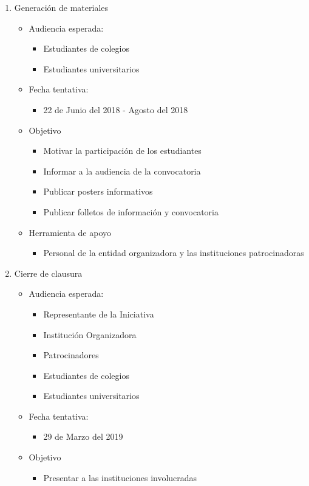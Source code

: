 \documentclass{article}
\begin{document}
\begin{enumerate}
\item Generación de materiales
\begin{itemize}
\item Audiencia esperada:
\begin{itemize}
\item Estudiantes de colegios
\item Estudiantes universitarios
\end{itemize}
\item Fecha tentativa:
\begin{itemize}
\item 22 de Junio del 2018 - Agosto del 2018
\end{itemize}
\item Objetivo
\begin{itemize}
\item Motivar la participación de los estudiantes
\item Informar a la audiencia de la convocatoria
\item Publicar posters informativos
\item Publicar folletos de información y convocatoria
\end{itemize}
\item Herramienta de apoyo
\begin{itemize}
\item Personal de la entidad organizadora y las instituciones patrocinadoras
\end{itemize}
\end{itemize}
\item Cierre de clausura
\begin{itemize}
\item Audiencia esperada:
\begin{itemize}
\item Representante de la Iniciativa
\item Institución Organizadora
\item Patrocinadores
\item Estudiantes de colegios
\item Estudiantes universitarios
\end{itemize}
\item Fecha tentativa:
\begin{itemize}
\item 29 de Marzo del 2019
\end{itemize}
\item Objetivo
\begin{itemize}
\item Presentar a las instituciones involucradas

\end{itemize}
\end{itemize}
\end{enumerate}
\end{document}
